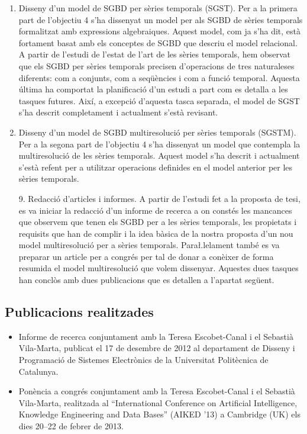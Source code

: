 \begin{enumerate}
\item Disseny d'un model de SGBD per sèries temporals (SGST). Per a la
  primera part de l'objectiu 4 s'ha dissenyat un model per als SGBD de
  sèries temporals formalitzat amb expressions algebraiques. Aquest
  model, com ja s'ha dit, està fortament basat amb els conceptes de
  SGBD que descriu el model relacional. A partir de l'estudi de
  l'estat de l'art de les sèries temporals, hem observat que els SGBD
  per sèries temporals precisen d'operacions de tres naturaleses
  diferents: com a conjunts, com a seqüències i com a funció temporal.
  Aquesta última ha comportat la planificació d'un estudi a part com
  es detalla a les tasques futures.  Així, a excepció d'aquesta tasca
  separada, el model de SGST s'ha descrit completament i actualment s'està
  revisant.



\item Disseny d'un model de SGBD multiresolució per sèries temporals
  (SGSTM). Per a la segona part de l'objectiu 4 s'ha dissenyat un
  model que contempla la multiresolució de les sèries
  temporals. Aquest model s'ha descrit i actualment s'està refent per
  a utilitzar operacions definides en el model anterior per les sèries
  temporals.


\item[9.] Redacció d'articles i informes. A partir de l'estudi fet a
  la proposta de tesi, es va iniciar la redacció d'un informe de
  recerca a on constés les mancances que observem que tenen els SGBD
  per a les sèries temporals, les propietats i requisits que han de
  complir i la idea bàsica de la nostra proposta d'un nou model
  multiresolució per a sèries temporals. Para\l.lelament també es va
  preparar un article per a congrés per tal de donar a conèixer de
  forma resumida el model multiresolució que volem dissenyar. Aquestes
  dues tasques han conclòs amb dues publicacions que es detallen a
  l'apartat següent.

\end{enumerate}


\subsection{Publicacions realitzades}

\begin{itemize}

\item Informe de recerca \parencite{llusa12:report} conjuntament amb
  la Teresa Escobet-Canal i el Sebastià Vila-Marta, publicat el 17 de
  desembre de 2012 al departament de Disseny i Programació de
  Sistemes Electrònics de la Universitat Politècnica de Catalunya.


\item Ponència a congrés \parencite{llusa13:aiked} conjuntament amb la
  Teresa Escobet-Canal i el Sebastià Vila-Marta, realitzada al
  ``International Conference on Artificial Intelligence, Knowledge
  Engineering and Data Bases'' (AIKED '13) a Cambridge (UK) els dies
  20--22 de febrer de 2013.
\end{itemize}




